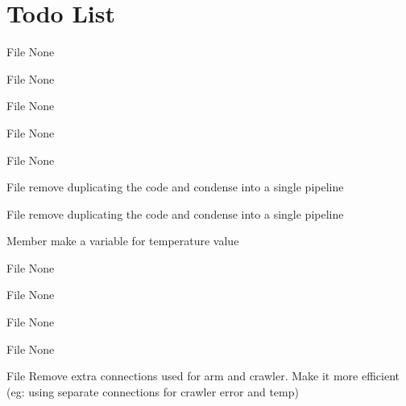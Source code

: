 \chapter{Todo List}
\hypertarget{todo}{}\label{todo}

\begin{DoxyRefList}
\item[File \doxylink{CButton_8qml}{CButton.qml} ]\label{todo__todo000015}%
%
None  
\item[File \doxylink{connectros_8cpp}{connectros.cpp} ]\label{todo__todo000001}%
%
None  
\item[File \doxylink{connectros_8h}{connectros.h} ]\label{todo__todo000002}%
%
None  
\item[File \doxylink{customplotitem_8cpp}{customplotitem.cpp} ]\label{todo__todo000003}%
%
None  
\item[File \doxylink{customplotitem_8h}{customplotitem.h} ]\label{todo__todo000004}%
%
None  
\item[File \doxylink{hellocpp_8cpp}{hellocpp.cpp} ]\label{todo__todo000005}%
%
remove duplicating the code and condense into a single pipeline  
\item[File \doxylink{hellocpp_8h}{hellocpp.h} ]\label{todo__todo000006}%
%
remove duplicating the code and condense into a single pipeline  
\item[Member \doxylink{classHome_a6ab206f6a13c0c3cebb9b35a1bb44687}{Home\+::crawler\+Temp} ]\label{todo__todo000019}%
%
make a variable for temperature value  
\item[File \doxylink{include_8h}{include.h} ]\label{todo__todo000007}%
%
None  
\item[File \doxylink{include2_8h}{include2.h} ]\label{todo__todo000008}%
%
None  
\item[File \doxylink{Login_8qml}{Login.qml} ]\label{todo__todo000020}%
%
None  
\item[File \doxylink{UI_2main_8qml}{main.qml} ]\label{todo__todo000016}%
%
None  
\item[File \doxylink{publisher_8cpp}{publisher.cpp} ]\label{todo__todo000009}%
%
Remove extra connections used for arm and crawler. Make it more efficient (eg\+: using separate connections for crawler error and temp)  

\end{DoxyRefList}
